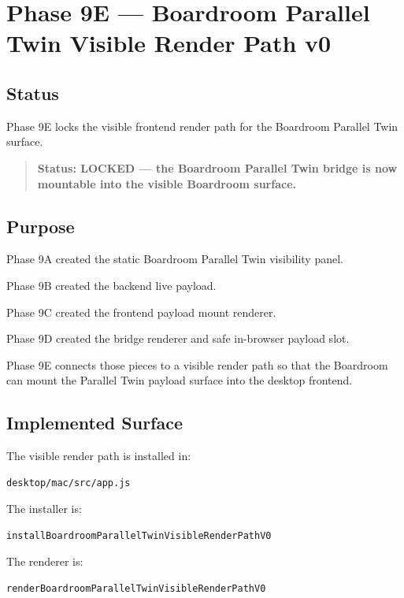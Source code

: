 \section{Phase 9E --- Boardroom Parallel Twin Visible Render Path v0}
\label{sec:aion-boardroom-parallel-twin-visible-render-path-v0}

\subsection{Status}

Phase 9E locks the visible frontend render path for the Boardroom Parallel Twin surface.

\begin{quote}
\textbf{Status: LOCKED --- the Boardroom Parallel Twin bridge is now mountable into the visible Boardroom surface.}
\end{quote}

\subsection{Purpose}

Phase 9A created the static Boardroom Parallel Twin visibility panel.

Phase 9B created the backend live payload.

Phase 9C created the frontend payload mount renderer.

Phase 9D created the bridge renderer and safe in-browser payload slot.

Phase 9E connects those pieces to a visible render path so that the Boardroom can mount the Parallel Twin payload surface into the desktop frontend.

\subsection{Implemented Surface}

The visible render path is installed in:

\begin{verbatim}
desktop/mac/src/app.js
\end{verbatim}

The installer is:

\begin{verbatim}
installBoardroomParallelTwinVisibleRenderPathV0
\end{verbatim}

The renderer is:

\begin{verbatim}
renderBoardroomParallelTwinVisibleRenderPathV0
\end{verbatim}

